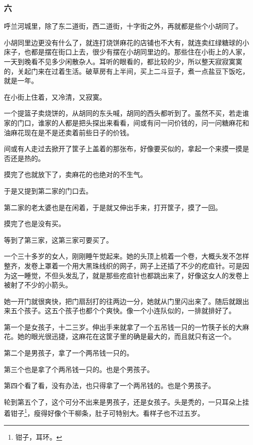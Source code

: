 \subsubsection*{六}
\par 呼兰河城里，除了东二道街，西二道街，十字街之外，再就都是些个小胡同了。
\par 小胡同里边更没有什么了，就连打烧饼麻花的店铺也不大有，就连卖红绿糖球的小床子，也都是摆在街口上去，很少有摆在小胡同里边的。那些住在小街上的人家，一天到晚看不见多少闲散杂人。耳听的眼看的，都比较的少，所以整天寂寂寞寞的，关起门来在过着生活。破草房有上半间，买上二斗豆子，煮一点盐豆下饭吃，就是一年。
\par 在小街上住着，又冷清，又寂寞。
\par 一个提篮子卖烧饼的，从胡同的东头喊，胡同的西头都听到了。虽然不买，若走谁家的门口，谁家的人都是把头探出来看看，间或有问一问价钱的，问一问糖麻花和油麻花现在是不是还卖着前些日子的价钱。
\par 间或有人走过去掀开了筐子上盖着的那张布，好像要买似的，拿起一个来摸一摸是否还是热的。
\par 摸完了也就放下了，卖麻花的也绝对的不生气。
\par 于是又提到第二家的门口去。
\par 第二家的老太婆也是在闲着，于是就又伸出手来，打开筐子，摸了一回。
\par 摸完了也是没有买。
\par 等到了第三家，这第三家可要买了。
\par 一个三十多岁的女人，刚刚睡午觉起来。她的头顶上梳着一个卷，大概头发不怎样整齐，发卷上罩着一个用大黑珠线织的网子，网子上还插了不少的疙疸针。可是因为这一睡觉，不但头发乱了，就是那些疙疸针也都跳出来了，好像这女人的发卷上被射了不少的小箭头。
\par 她一开门就很爽快，把门扇刮打的往两边一分，她就从门里闪出来了。随后就跟出来五个孩子。这五个孩子也都个个爽快。像一个小连队似的，一排就排好了。
\par 第一个是女孩子，十二三岁。伸出手来就拿了一个五吊钱一只的一竹筷子长的大麻花。她的眼光很迅捷，这麻花在这筐子里的确是最大的，而且就只有这一个。
\par 第二个是男孩子，拿了一个两吊钱一只的。
\par 第三个也是拿了个两吊钱一只的。也是个男孩子。
\par 第四个看了看，没有办法，也只得拿了一个两吊钱的。也是个男孩子。
\par 轮到第五个了，这个可分不出来是男孩子，还是女孩子。头是秃的，一只耳朵上挂着钳子\footnote{钳子，耳环。}，瘦得好像个干柳条，肚子可特别大。看样子也不过五岁。
